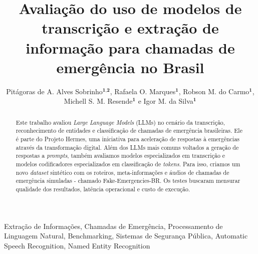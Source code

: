 \documentclass{IEEEphot}
\def\authorrefmark#1{\ensuremath{^{\textbf{#1}}}}
\begin{document}


\title{Avaliação do uso de modelos de transcrição e extração de informação para chamadas de emergência no Brasil}

\author{Pitágoras de A. Alves Sobrinho\authorrefmark{1,2}, Rafaela O. Marques\authorrefmark{1}, Robson M. do Carmo\authorrefmark{1},\\ Michell S. M. Resende\authorrefmark{1} e Igor M. da Silva\authorrefmark{1}}


\begin{abstract}
Este trabalho avaliou \textit{Large Language Models} (LLMs) no cenário da transcrição, reconhecimento de entidades e classificação de chamadas de emergência brasileiras. Ele é parte do Projeto Hermes, uma iniciativa para aceleração de respostas à emergências através da transformação digital. Além dos LLMs mais comuns voltados a geração de respostas a \textit{prompts}, também avaliamos modelos especializados em transcrição e modelos codificadores especializados em classificação de \textit{tokens}. Para isso, criamos um novo \textit{dataset} sintético com os roteiros, meta-informações e áudios de chamadas de emergência simuladas - chamado Fake-Emergencies-BR. Os testes buscaram mensurar qualidade dos resultados, latência operacional e custo de execução. 

\end{abstract}

\begin{IEEEkeywords}
Extração de Informações, Chamadas de Emergência, Processamento de Linguagem Natural, Benchmarking, Sistemas de Segurança Pública, Automatic Speech Recognition, Named Entity Recognition
\end{IEEEkeywords}
\end{document}
